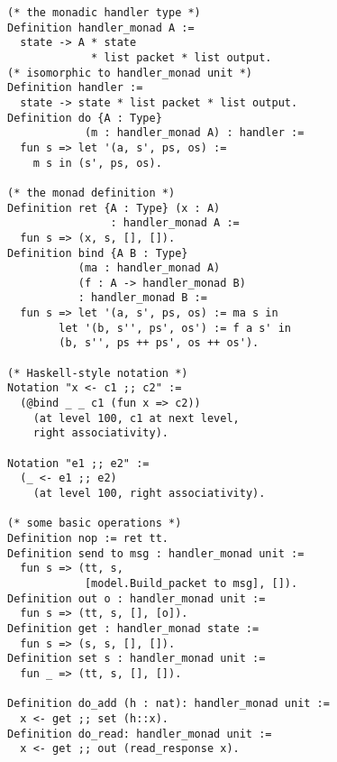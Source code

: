 \documentclass[twocolumn]{article}
\begin{document}
\begin{center}
\small
\begin{verbatim}
(* the monadic handler type *)
Definition handler_monad A :=
  state -> A * state
             * list packet * list output.
(* isomorphic to handler_monad unit *)
Definition handler :=
  state -> state * list packet * list output.
Definition do {A : Type}
            (m : handler_monad A) : handler :=
  fun s => let '(a, s', ps, os) :=
    m s in (s', ps, os).

(* the monad definition *)
Definition ret {A : Type} (x : A)
                : handler_monad A :=
  fun s => (x, s, [], []).
Definition bind {A B : Type}
           (ma : handler_monad A)
           (f : A -> handler_monad B)
           : handler_monad B :=
  fun s => let '(a, s', ps, os) := ma s in
        let '(b, s'', ps', os') := f a s' in
        (b, s'', ps ++ ps', os ++ os').

(* Haskell-style notation *)
Notation "x <- c1 ;; c2" :=
  (@bind _ _ c1 (fun x => c2))
    (at level 100, c1 at next level,
    right associativity).

Notation "e1 ;; e2" :=
  (_ <- e1 ;; e2)
    (at level 100, right associativity).

(* some basic operations *)
Definition nop := ret tt.
Definition send to msg : handler_monad unit :=
  fun s => (tt, s,
            [model.Build_packet to msg], []).
Definition out o : handler_monad unit :=
  fun s => (tt, s, [], [o]).
Definition get : handler_monad state :=
  fun s => (s, s, [], []).
Definition set s : handler_monad unit :=
  fun _ => (tt, s, [], []).

Definition do_add (h : nat): handler_monad unit :=
  x <- get ;; set (h::x).
Definition do_read: handler_monad unit :=
  x <- get ;; out (read_response x).
\end{verbatim}
\end{center}
\end{document}
